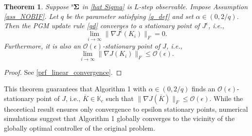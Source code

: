 \documentclass[preprint,5p,times,twocolumn]{elsarticle}
\newcommand{\bm}[1]{{\mbox{\boldmath $#1$}}}
\newtheorem{theo}{Theorem}
\def\rms{{}^{\rm s}\hspace{-0.2mm}}
\begin{document}
\begin{theo}\label{linear_convergence}
Suppose $\rms {\bm \Sigma}$ in \eqref{hat Sigma} is $L$-step observable. Impose Assumption \ref{ass_NOBIF}. Let $q$ be the parameter satisfying \eqref{q_def} and set $\alpha \in (0, 2/q)$. Then the PGM update rule \eqref{gd} converges to a stationary point of $J^{\epsilon}$, i.e.,  
\begin{equation}\label{statio_Je}
    \lim_{i \to \infty} \| \nabla J^{\epsilon}(K_i)\|_F = 0.
\end{equation}
Furthermore, it is also an $\mathcal O({\epsilon})$-stationary point of $J$, i.e.,  
\begin{equation}\label{statio_Jori}
    \lim_{i \to \infty} \| \nabla J(K_i)\|_F \leq \mathcal O(\epsilon).
\end{equation}
\end{theo}
\begin{proof}
See \ref{prf_linear_convergence}. 
\end{proof}
This theorem guarantees that Algorithm 1 with $\alpha \in (0, 2/q)$ finds an $\mathcal{O}(\epsilon)$-stationary point of $J$, i.e., $\overline{K} \in \mathbb{K}_c$ such that $\|\nabla J(\overline{K})\|_F \leq \mathcal{O}(\epsilon)$. 
While the theoretical result ensures only convergence to epsilon stationary points, numerical simulations suggest that Algorithm 1 globally converges to the vicinity of the globally optimal controller of the original problem. 
\end{document}
